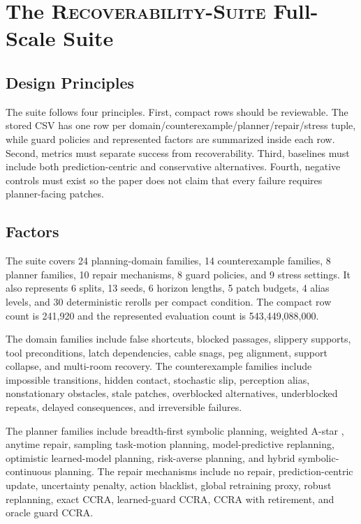 \documentclass{article}
\newcommand{\ccra}{\textsc{CCRA}}
\newcommand{\suite}{\textsc{Recoverability-Suite}}
\begin{document}
\section{The \suite{} Full-Scale Suite}

\subsection{Design Principles}

The suite follows four principles. First, compact rows should be reviewable. The
stored CSV has one row per domain/counterexample/planner/repair/stress tuple,
while guard policies and represented factors are summarized inside each row.
Second, metrics must separate success from recoverability. Third, baselines must
include both prediction-centric and conservative alternatives. Fourth, negative
controls must exist so the paper does not claim that every failure requires
planner-facing patches.



\subsection{Factors}

The suite covers 24 planning-domain families, 14 counterexample families, 8
planner families, 10 repair mechanisms, 8 guard policies, and 9 stress settings.
It also represents 6 splits, 13 seeds, 6 horizon lengths, 5 patch budgets, 4
alias levels, and 30 deterministic rerolls per compact condition. The compact
row count is 241,920 and the represented evaluation count is 543,449,088,000.

The domain families include false shortcuts, blocked passages, slippery
supports, tool preconditions, latch dependencies, cable snags, peg alignment,
support collapse, and multi-room recovery. The counterexample families include
impossible transitions, hidden contact, stochastic slip, perception alias,
nonstationary obstacles, stale patches, overblocked alternatives,
underblocked repeats, delayed consequences, and irreversible failures.

The planner families include breadth-first symbolic planning, weighted A-star
\citep{hart1968formal}, anytime repair, sampling task-motion planning,
model-predictive replanning, optimistic learned-model planning, risk-averse
planning, and hybrid symbolic-continuous planning. The repair mechanisms include
no repair, prediction-centric update, uncertainty penalty, action blacklist,
global retraining proxy, robust replanning, exact \ccra{}, learned-guard
\ccra{}, \ccra{} with retirement, and oracle guard \ccra{}.
\end{document}

